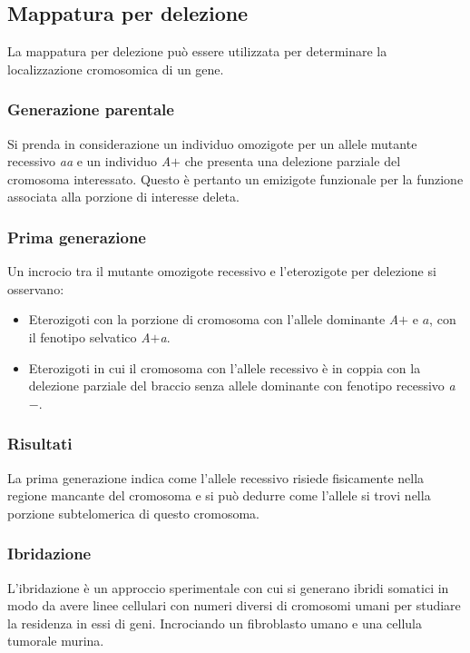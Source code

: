 	\subsection{Mappatura per delezione}
	La mappatura per delezione pu\`o essere utilizzata per determinare la localizzazione cromosomica di un gene.
	
		\subsubsection{Generazione parentale}
		Si prenda in considerazione un individuo omozigote per un allele mutante recessivo \emph{aa} e un individuo \emph{A$+$} che presenta una delezione parziale del cromosoma interessato.
		Questo \`e pertanto un emizigote funzionale per la funzione associata alla porzione di interesse deleta.
	
		\subsubsection{Prima generazione}
		Un incrocio tra il mutante omozigote recessivo e l'eterozigote per delezione si osservano:
		\begin{multicols}{2}
			\begin{itemize}
				\item Eterozigoti con la porzione di cromosoma con l'allele dominante \emph{A$+$} e $a$, con il fenotipo selvatico \emph{A$+$a}.
				\item Eterozigoti in cui il cromosoma con l'allele recessivo \`e in coppia con la delezione parziale del braccio senza allele dominante con fenotipo recessivo \emph{a$-$}.
			\end{itemize}
		\end{multicols}

		\subsubsection{Risultati}
		La prima generazione indica come l'allele recessivo risiede fisicamente nella regione mancante del cromosoma e si pu\`o dedurre come l'allele si trovi nella porzione subtelomerica di questo cromosoma.
	
		\subsubsection{Ibridazione}
		L'ibridazione \`e un approccio sperimentale con cui si generano ibridi somatici in modo da avere linee cellulari con numeri diversi di cromosomi umani per studiare la residenza in essi di geni.
		Incrociando un fibroblasto umano e una cellula tumorale murina.


